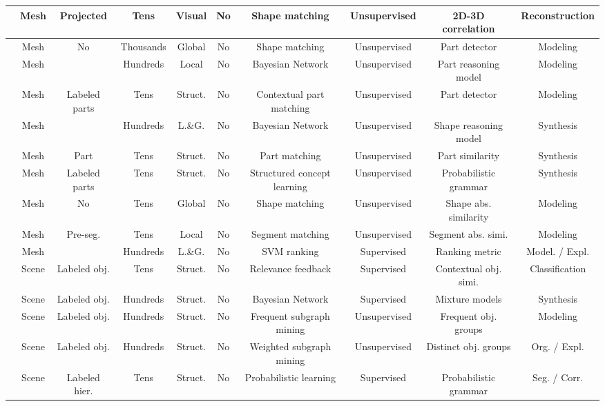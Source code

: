 \begin{table*}[t!]
\begin{tabular*}{\textwidth}{l|c|c|c|c|c|c|c|c|c}
    \cite{Su:2014:EID}	&Mesh	&Projected	&Tens	&Visual	&No	&Shape matching	&Unsupervised	&2D-3D correlation	&Reconstruction \\ \hline
	\cite{Chaudhuri:2010:DDS} &Mesh	&No	&Thousands	&Global	&No	&Shape matching	&Unsupervised	&Part detector	&Modeling \\ \hline
	\cite{Chaudhuri:2011:prabm}	&Mesh	&\cite{Kalogerakis:2010:LMS}	&Hundreds	&Local	&No	&Bayesian Network	&Unsupervised	&Part reasoning model	&Modeling \\ \hline
	\cite{Xie:2013:S2D}	&Mesh	&Labeled parts	&Tens	&Struct.	&No	&Contextual part matching	&Unsupervised	&Part detector	&Modeling \\ \hline
	\cite{Kalogerakis:2012:PMC}	&Mesh	&\cite{Kalogerakis:2010:LMS}	&Hundreds	&L.\&G.	&No	&Bayesian Network	&Unsupervised	&Shape reasoning model	&Synthesis \\ \hline
	\cite{Xu:FDS:2012}	&Mesh	&Part	&Tens	&Struct.	&No	&Part matching	&Unsupervised	&Part similarity	&Synthesis \\ \hline
	\cite{Talton:2012:LDP}	&Mesh	&Labeled parts	&Tens	&Struct.	&No	&Structured concept learning	&Unsupervised	&Probabilistic grammar	&Synthesis \\ \hline
	\cite{Yumer:2012:CSC}	&Mesh	&No	&Tens	&Global	&No	&Shape matching	&Unsupervised	&Shape abs. similarity	&Modeling \\ \hline
	\cite{Yumer:2014:CCH}	&Mesh	&Pre-seg.	&Tens	&Local	&No	&Segment matching	&Unsupervised	&Segment abs. simi.	&Modeling \\ \hline
    \cite{Chaudhuri:2013:ACC}   &Mesh	&\cite{Kalogerakis:2010:LMS}	&Hundreds	&L.\&G.	&No	&SVM ranking        &Supervised	        & Ranking metric	& Model. / Expl. \\ \hline
	\cite{Fisher:2011:CSR}	&Scene	&Labeled obj.	&Tens	&Struct.	&No	&Relevance feedback	&Supervised	&Contextual obj. simi.	&Classification \\ \hline
    \cite{Fisher:2012:CSR}	&Scene	&Labeled obj.	&Hundreds	&Struct.	&No	&Bayesian Network	&Supervised	&Mixture models	&Synthesis \\ \hline
    \cite{Xu:2013:S2S}	&Scene	&Labeled obj.	&Hundreds	&Struct.	&No	&Frequent subgraph mining	&Unsupervised	&Frequent obj. groups	&Modeling \\ \hline
    \cite{Xu:2014:OHSC}	&Scene	&Labeled obj.	&Hundreds	&Struct.	&No	&Weighted subgraph mining	&Unsupervised	&Distinct obj. groups	&Org. / Expl. \\ \hline
    \cite{Liu:2014:CCS}	&Scene	&Labeled hier.	&Tens	&Struct.	&No	&Probabilistic learning	&Supervised	&Probabilistic grammar	&Seg. / Corr. \\

\end{tabular*}
\end{table*}
